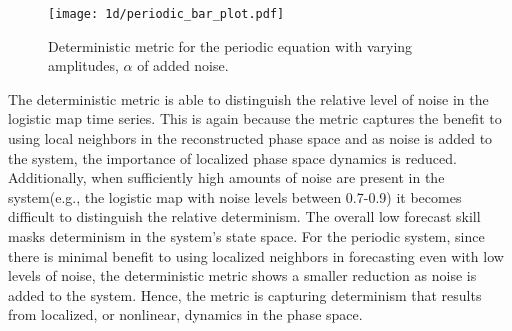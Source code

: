 \begin{figure}[htbp]  %
   \centering
   \texttt{[image: 1d/periodic\_bar\_plot.pdf]} 
   \caption{Deterministic metric for the periodic equation with varying amplitudes, $\alpha$ of added noise.}
   \label{periodic_bar_plot}
\end{figure}



The deterministic metric is able to distinguish the relative level of noise in the logistic map time series.  This is again because the metric captures the benefit to using local neighbors in the reconstructed phase space and as noise is added to the system, the importance of localized phase space dynamics is reduced.  Additionally, when sufficiently high amounts of noise are present in the system(e.g., the logistic map with noise levels between 0.7-0.9) it becomes difficult to distinguish the relative determinism.  The overall low forecast skill masks determinism in the system's state space. For the periodic system, since there is minimal benefit to using localized neighbors in forecasting even with low levels of noise, the deterministic metric shows a smaller reduction as noise is added to the system.  Hence, the metric is capturing determinism that results from localized, or nonlinear, dynamics in the phase space.  









